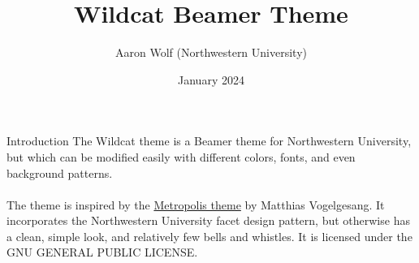 \documentclass[aspectratio=1610]{beamer}
\title{Wildcat Beamer Theme}
\date{January 2024}
\author{Aaron Wolf (Northwestern University)}
\begin{document}
\begin{frame}
\titlepage
\end{frame}


\begin{frame}{Introduction}
    The Wildcat theme is a Beamer theme for Northwestern University, but which can be modified easily with different colors, fonts, and even background patterns. 
    \\ ~ \\
    The theme is inspired by the \href{https://github.com/matze/ mtheme}{Metropolis theme} by Matthias Vogelgesang. It incorporates the Northwestern University facet design pattern, but otherwise has a clean, simple look, and relatively few bells and whistles. It is licensed under the GNU GENERAL PUBLIC LICENSE.
\end{frame}
\end{document}
